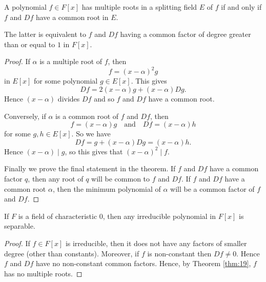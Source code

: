 \begin{theorem}\label{thm:19}
	A polynomial $f \in F[x]$ has multiple roots in a splitting field $E$ of $f$ if and only if $f$ and $Df$ have a common root in $E$.
	
	The latter is equivalent to $f$ and $Df$ having a common factor of degree greater than or equal to $1$ in $F[x]$.
	\begin{proof}
		If $\alpha$ is a multiple root of $f$, then
		\[
			f = (x - \alpha)^2 g
		\]
		in $E[x]$ for some polynomial $g \in E[x]$. This gives
		\[
			Df = 2(x - \alpha)g + (x - \alpha) Dg.
		\]
		Hence $(x - \alpha)$ divides $Df$ and so $f$ and $Df$ have a common root.
		
		Conversely, if $\alpha$ is a common root of $f$ and $Df$, then
		\[
			f = (x - \alpha)g \quad \text{and} \quad Df = (x - \alpha)h
		\]
		for some $g, h \in E[x]$. So we have
		\[
			Df = g + (x - \alpha)Dg = (x - \alpha)h.
		\]
		Hence $(x - \alpha) \mid g$, so this gives that $(x - \alpha)^2 \mid f$.
		
		Finally we prove the final statement in the theorem. If $f$ and $Df$ have a common factor $q$, then any root of $q$ will be common to $f$ and $Df$. If $f$ and $Df$ have a common root $\alpha$, then the minimum polynomial of $\alpha$ will be a common factor of $f$ and $Df$.
	\end{proof}
\end{theorem}

\begin{corollary}\label{cor:to-thm-19}
	If $F$ is a field of characteristic 0, then any irreducible polynomial in $F[x]$ is separable.
	\begin{proof}
		If $f \in F[x]$ is irreducible, then it does not have any factors of smaller degree (other than constants). Moreover, if $f$ is non-constant then $Df \neq 0$. Hence $f$ and $Df$ have no non-constant common factors. Hence, by Theorem \ref{thm:19}, $f$ has no multiple roots.
	\end{proof}
\end{corollary}

